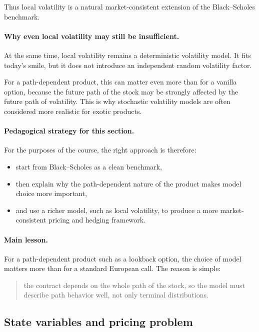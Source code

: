 \documentclass[11pt]{article}
\theoremstyle{plain}
\theoremstyle{definition}
\theoremstyle{remark}
\begin{document}
Thus local volatility is a natural market-consistent extension of the
Black--Scholes benchmark.

\paragraph{Why even local volatility may still be insufficient.}
At the same time, local volatility remains a deterministic volatility
model.
It fits today's smile, but it does not introduce an independent random
volatility factor.

For a path-dependent product, this can matter even more than for a
vanilla option, because the future path of the stock may be strongly
affected by the future path of volatility.
This is why stochastic volatility models are often considered more
realistic for exotic products.

\paragraph{Pedagogical strategy for this section.}
For the purposes of the course, the right approach is therefore:
\begin{itemize}[leftmargin=1.4em]
    \item start from Black--Scholes as a clean benchmark,
    \item then explain why the path-dependent nature of the product makes
    model choice more important,
    \item and use a richer model, such as local volatility, to produce a
    more market-consistent pricing and hedging framework.
\end{itemize}

\paragraph{Main lesson.}
For a path-dependent product such as a lookback option, the choice of
model matters more than for a standard European call.
The reason is simple:
\begin{quote}
the contract depends on the whole path of the stock, so the model must
describe path behavior well, not only terminal distributions.
\end{quote}

\subsection{State variables and pricing problem}
\end{document}
